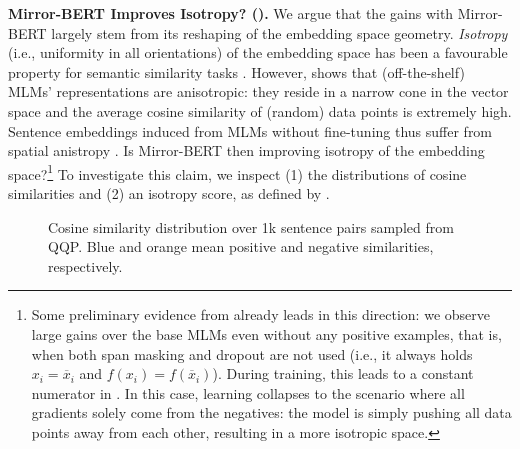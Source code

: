 \documentclass[11pt]{article}
\begin{document}
\vspace{1.2mm}
\noindent \textbf{Mirror-BERT Improves Isotropy? ().} We argue that the gains with Mirror-BERT largely stem from its reshaping of the embedding space geometry. \textit{Isotropy} (i.e., uniformity in all orientations) of the embedding space has been a favourable property for semantic similarity tasks \citep{arora2016latent,mu2017all}. However, \citet{ethayarajh2019contextual} shows that (off-the-shelf) MLMs' representations are anisotropic: they reside in a narrow cone in the vector space and the average cosine similarity of (random) data points is extremely high. Sentence embeddings induced from MLMs without fine-tuning thus suffer from spatial anistropy \citep{li-etal-2020-sentence,su2021whitening}. Is Mirror-BERT then improving isotropy of the embedding space?\footnote{Some preliminary evidence from  already leads in this direction: we observe large gains over the base MLMs even without any positive examples, that is, when both span masking and dropout are not used (i.e., it always holds $x_i = \overline{x}_i$ and $f(x_i) = f(\overline{x}_i)$). During training, this leads to a constant numerator in . In this case, learning collapses to the scenario where all gradients solely come from the negatives: the model is simply pushing all data points away from each other, resulting in a more isotropic space.} To investigate this claim, we inspect (1) the distributions of cosine similarities and (2) an isotropy score, as defined by \citet{mu2017all}. 






\begin{figure}[!t]
 \centering
 \hfill
  \vspace{-1mm}
\caption{Cosine similarity distribution over 1k sentence pairs sampled from QQP. {\color{plot_blue}Blue} and {\color{plot_orange}orange} mean positive and negative similarities, respectively.}
\label{fig:cosine_distribution}
\vspace{-1.0mm}
\end{figure} 
\end{document}
